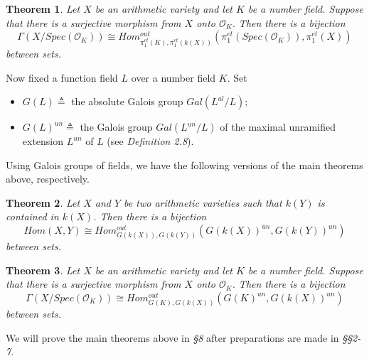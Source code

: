 \documentclass[12pt,twoside,reqno]{amsart}
\newtheorem{theorem}{Theorem}[section]
\theoremstyle{definition}
\numberwithin{equation}{section}
\begin{document}
\begin{theorem}
Let $X$ be an arithmetic variety and let $K$ be a number field. Suppose that
there is a surjective morphism from $X$ onto $\mathcal{O}_{K}.$ Then there
is a bijection
\begin{equation*}
\Gamma \left( X/Spec\left( \mathcal{O}_{K}\right)\right) \cong Hom_{\pi _{1}^{et}(K),\pi _{1}^{et}(k(X)) }^{out}\left( \pi _{1}^{et}(Spec(\mathcal{O}_{K})) ,\pi _{1}^{et}\left( X\right) \right)
\end{equation*}
between sets.
\end{theorem}

Now fixed a function field $L$ over a number field $K$. Set
\begin{itemize}
\item $G(L)\triangleq$ the absolute Galois group $Gal(L^{al}/L)$;

\item $G(L)^{un}\triangleq$ the Galois group $Gal(L^{un}/L)$ of the maximal unramified extension $L^{un}$ of $L$ (see \emph{Definition 2.8}).
\end{itemize}

Using Galois groups of fields, we  have the following versions of the main theorems above, respectively.

\begin{theorem}
Let $X$ and $Y$ be two arithmetic varieties such that $k\left( Y\right) $ is contained in $ k\left( X\right)$. Then there is a bijection
\begin{equation*}
Hom\left( X,Y\right) \cong Hom_{G(k(X)),G(k(Y))
}^{out}\left( G\left( k(X)\right)^{un} ,G\left( k(Y)\right)^{un}
\right)
\end{equation*}
between sets.
\end{theorem}

\begin{theorem}
Let $X$ be an arithmetic variety and let $K$ be a number field. Suppose that
there is a surjective morphism from $X$ onto $\mathcal{O}_{K}.$ Then there
is a bijection
\begin{equation*}
\Gamma \left( X/Spec\left( \mathcal{O}_{K}\right)\right) \cong Hom_{G(K),G(k(X)) }^{out}\left( G\left( K\right)^{un} ,G\left( k(X)\right)^{un} \right)
\end{equation*}
between sets.
\end{theorem}


We will prove the main theorems above in \emph{\S 8} after preparations are made in \emph{\S\S 2-7}.
\end{document}
